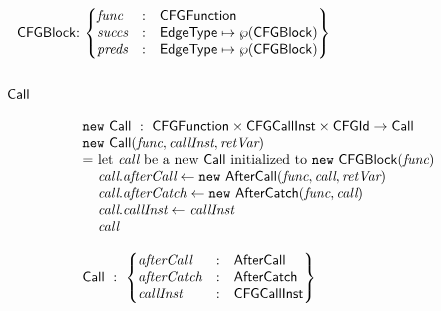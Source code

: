 \hspace*{-2em}
$\begin{array}{@{~}r@{~}l@{}l@{~}l}
& \CFGBlock & : &
\begin{Bmatrix*}[l]
\emph{func} & : & \CFGFunction \\
\emph{succs} & : & \EdgeType \mapsto \powerset{\CFGBlock} \\
\emph{preds} & : & \EdgeType \mapsto \powerset{\CFGBlock} \\
\end{Bmatrix*}\\
\end{array}
$

\subsection{$\mbox{\textsf{Call}}$}
\[
\begin{array}{l@{}l@{~}l}
\lefteqn{\new \ \Call \ : \ \CFGFunction \times \CFGCallInst \times \CFGId \rightarrow \Call} \\
\lefteqn{\new\ \Call(\emph{func}, \emph{callInst}, \emph{retVar})}\\
& = & \text{let } \emph{call} \text{ be a new } \Call \text{ initialized to } \new\ \CFGBlock(\emph{func})\\
& & \emph{call}.\emph{afterCall} \leftarrow \new\ \AfterCall(\emph{func}, \emph{call}, \emph{retVar})\\
& & \emph{call}.\emph{afterCatch} \leftarrow \new\ \AfterCatch(\emph{func}, \emph{call})\\
& & \emph{call}.\emph{callInst} \leftarrow \emph{callInst}\\
& & \emph{call}\\\\
\lefteqn{ \Call \ : \
\begin{Bmatrix*}[l]
\emph{afterCall} & : & \AfterCall\\
\emph{afterCatch} & : & \AfterCatch\\
\emph{callInst} & : & \CFGCallInst\\
\end{Bmatrix*}
}
\end{array}
\]

